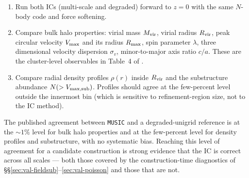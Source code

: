 \documentclass[12pt]{article}
\begin{document}
\begin{enumerate}
      \textit{Relation to approach A1.} The restriction operator used
      here is exactly approach A1 of \S\ref{sec:zoom}: block-average
      $\boldsymbol\Psi_{2N}$ over $2^d$ fine cells, with Fourier
      multiplier $W_{\rm A1}(\mathbf k)=\prod_a\cos(k_a\Delta x_f/2)$.
      The same $\cos^2$ near-Nyquist suppression and alias-folding are
      therefore present in the degraded reference. What is \emph{not}
      present is the additional error that a real production zoom code
      makes at the coarse-fine boundary: real zoom codes do not have
      $\boldsymbol\Psi_{2N}$ outside $\Omega$ at all and generate the
      lo-res field there from a separate coarse white noise $\mu_N$,
      with the job of approaches A1/A2/B being to stitch the two
      regions together. In the degraded reference a single $\mu_{2N}$
      covers the whole box, so the long-wavelength modes inside and
      outside $\Omega$ come from the same underlying noise field and
      there is no boundary-stitching to get wrong. The degraded
      reference therefore inherits the suppression and aliasing of
      A1's $\cos^2$ Fourier multiplier --- the same $|W_{\rm A1}|^2$
      factor in eq.~(\ref{eq:Pk-alias}) that the toy demo of
      \S\ref{sec:zoom} measured against ideal-lowpass~B --- but it
      does not inherit the boundary-stitching error, and is what defines ``correct'' for the
      comparison below: the zoom IC under test should reproduce the
      degraded reference's halo properties to within the cosmic-variance
      noise that survives non-linear evolution.
\item Run both ICs (multi-scale and degraded) forward to $z=0$ with
      the same $N$-body code and force softening.
\item Compare bulk halo properties: virial mass $M_{\rm vir}$,
      virial radius $R_{\rm vir}$, peak circular velocity $V_{\rm max}$
      and its radius $R_{\rm max}$, spin parameter $\lambda$, three
      dimensional velocity dispersion $\sigma_v$, minor-to-major axis
      ratio $c/a$. These are the cluster-level observables in
      Table~4 of \citet{Hahn2011}.
\item Compare radial density profiles $\rho(r)$ inside $R_{\rm vir}$
      and the substructure abundance $N(>V_{\rm max,sub})$. Profiles
      should agree at the few-percent level outside the innermost
      bin (which is sensitive to refinement-region size, not to the
      IC method).
\end{enumerate}
The published agreement between \texttt{MUSIC} and a degraded-unigrid
reference is at the $\sim 1\%$ level for bulk halo properties and at
the few-percent level for density profiles and substructure, with no
systematic bias. Reaching this level of agreement for a candidate
construction is strong evidence that the IC is correct across all
scales --- both those covered by the construction-time diagnostics of
\S\S\ref{sec:val-fieldsub}--\ref{sec:val-poisson} and those that are
not.
\end{document}
